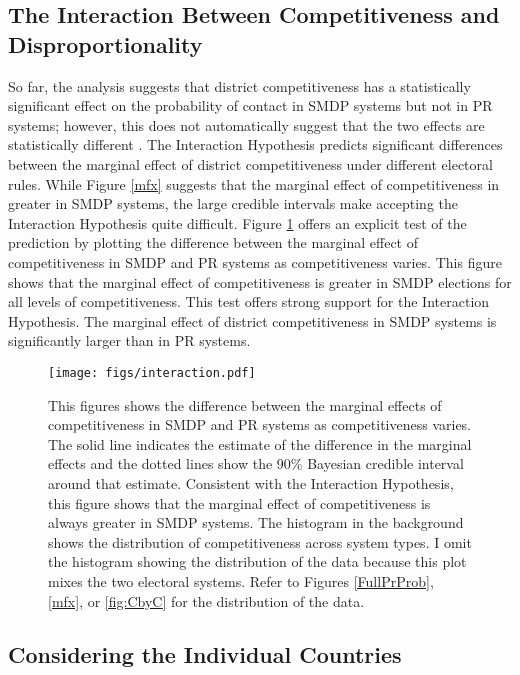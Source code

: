 \documentclass[12pt]{article}
\begin{document}
\subsection*{The Interaction Between Competitiveness and Disproportionality}

So far, the analysis suggests that district competitiveness has a statistically significant effect on the probability of contact in SMDP systems but not in PR systems; however, this does not automatically suggest that the two effects are statistically different \citep{GelmanStern2006}. The Interaction Hypothesis predicts significant differences between the marginal effect of district competitiveness under different electoral rules. While Figure \ref{mfx} suggests that the marginal effect of competitiveness in greater in SMDP systems, the large credible intervals make accepting the Interaction Hypothesis quite difficult. Figure \ref{mfxdif} offers an explicit test of the prediction by plotting the difference between the marginal effect of competitiveness in SMDP and PR systems as competitiveness varies. This figure shows that the marginal effect of competitiveness is greater in SMDP elections for all levels of competitiveness. This test offers strong support for the Interaction Hypothesis. The marginal effect of district competitiveness in SMDP systems is significantly larger than in PR systems. 

\begin{figure}[h]
\centering
\texttt{[image: figs/interaction.pdf]}
\caption{This figures shows the difference between the marginal effects of competitiveness in SMDP and PR systems as competitiveness varies. The solid line indicates the estimate of the difference in the marginal effects and the dotted lines show the 90\% Bayesian credible interval around that estimate. Consistent with the Interaction Hypothesis, this figure shows that the marginal effect of competitiveness is always greater in SMDP systems. The histogram in the background shows the distribution of competitiveness across system types. I omit the histogram showing the distribution of the data because this plot mixes the two electoral systems. Refer to Figures \ref{FullPrProb}, \ref{mfx}, or \ref{fig:CbyC} for the distribution of the data.}\label{mfxdif}
\end{figure}

\subsection*{Considering the Individual Countries}
\end{document}
